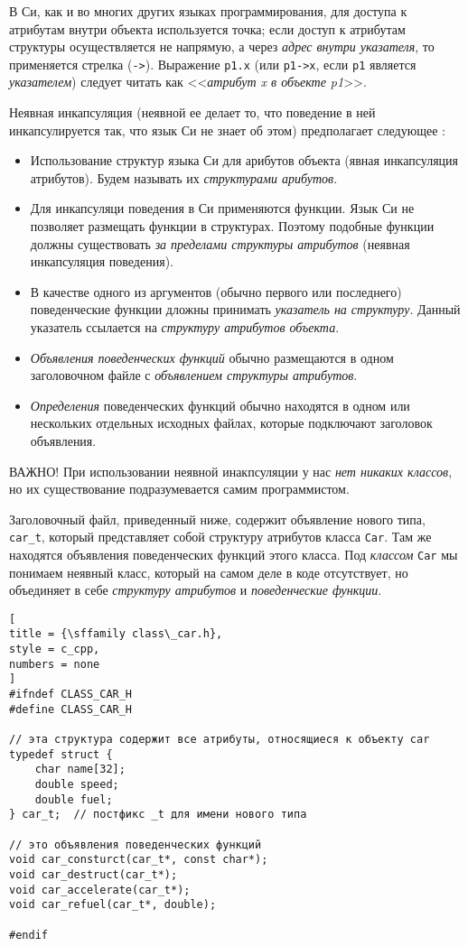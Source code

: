 \documentclass[%
	11pt,
	a4paper,
	utf8,
		]{article}
\begin{document}
В Си, как и во многих других языках программирования, для доступа к атрибутам внутри объекта используется точка; если доступ к атрибутам структуры осуществляется не напрямую, а через \emph{адрес внутри указателя}, то применяется стрелка (\verb|->|). Выражение \verb|p1.x| (или \verb|p1->x|, если \verb|p1| является \emph{указателем}) следует читать как <<\emph{атрибут x в объекте p1}>>.

Неявная инкапсуляция (неявной ее делает то, что поведение в ней инкапсулируется так, что язык Си не знает об этом) предполагает следующее \cite[]{amini-extreme-c:2022}:
\begin{itemize}
	\item Использование структур языка Си для арибутов объекта (явная инкапсуляция атрибутов). Будем называть их \emph{структурами арибутов}.
	
	\item Для инкапсуляци поведения в Си применяются функции. {\color{red}Язык Си не позволяет размещать функции в структурах}. Поэтому подобные функции должны существовать \emph{за пределами структуры атрибутов} (неявная инкапсуляция поведения).
	
	\item В качестве одного из аргументов (обычно первого или последнего) поведенческие функции дложны принимать \emph{указатель на структуру}. Данный указатель ссылается на \emph{структуру атрибутов объекта}.
	
	\item \emph{Объявления поведенческих функций} обычно размещаются в одном заголовочном файле с \emph{объявлением структуры атрибутов}.
	
	\item \emph{Определения} поведенческих функций обычно находятся в одном или нескольких отдельных исходных файлах, которые подключают заголовок объявления.
\end{itemize}

ВАЖНО! При использовании неявной инакпсуляции у нас \emph{нет никаких классов}, но их существование подразумевается самим программистом. 

Заголовочный файл, приведенный ниже, содержит объявление нового типа, \verb|car_t|, который представляет собой структуру атрибутов класса \verb|Car|. Там же находятся объявления поведенческих функций этого класса. Под \emph{классом} \verb|Car| мы понимаем неявный класс, который на самом деле в коде отсутствует, но объединяет в себе \emph{структуру атрибутов} и \emph{поведенческие функции}.
\begin{lstlisting}[
title = {\sffamily class\_car.h},
style = c_cpp,
numbers = none
]
#ifndef CLASS_CAR_H
#define CLASS_CAR_H

// эта структура содержит все атрибуты, относящиеся к объекту car
typedef struct {
    char name[32];
    double speed;
    double fuel;
} car_t;  // постфикс _t для имени нового типа

// это объявления поведенческих функций
void car_consturct(car_t*, const char*);
void car_destruct(car_t*);
void car_accelerate(car_t*);
void car_refuel(car_t*, double);

#endif
\end{lstlisting}
\end{document}
